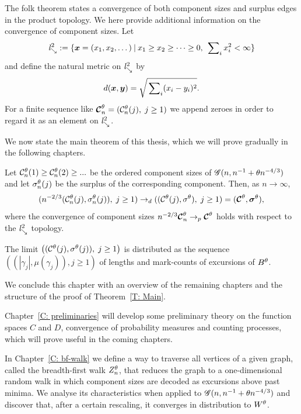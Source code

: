 The folk theorem states a convergence of both component sizes and surplus edges in the product topology.
We here provide additional information on the convergence of component sizes.
Let
\begin{equation}
	\mathit{l}^2_{\searrow} := \{ \boldsymbol{x} = (x_1, x_2, \dots) \: | \: x_1 \geq x_2 \geq \dots \geq 0, \; \sideset{}{_i}\sum x^2_i < \infty \}
\end{equation}
and define the natural metric on $\mathit{l}^2_{\searrow}$ by
\begin{equation}
	d(\boldsymbol{x},\boldsymbol{y}) = \sqrt{\sideset{}{_i}\sum (x_i - y_i)^2}.
\end{equation}
For a finite sequence like $\boldsymbol{\mathcal{C}}^{\theta}_n = (\mathcal{C}^{\theta}_n(j), \; j \geq 1)$ we append zeroes in order to regard it as an element on $\mathit{l}^2_{\searrow}$.


We now state the main theorem of this thesis, which we will prove gradually in the following chapters.
\begin{theorem} \label{T: Main}
	Let $\mathcal{C}^{\theta}_n(1) \geq \mathcal{C}^{\theta}_n(2) \geq ... $ be the ordered component sizes of $\mathscr{G}(n, n^{-1} + \theta n^{-4/3})$
	and let $\mathcal{\sigma}^{\theta}_n(j)$ be the surplus of the corresponding component.
	Then, as $n \rightarrow \infty$,
	\begin{equation}
	( n^{-2 / 3} ( \mathcal{C}^{\theta}_n(j), \mathcal{\sigma}^{\theta}_n(j) ), \; j \geq 1 ) 
	\rightarrow_d
	( (\mathcal{C}^{\theta}(j), \mathcal{\sigma}^{\theta}), \; j \geq 1 )
	= ( \boldsymbol{\mathcal{C}}^{\theta}, \boldsymbol{\mathcal{\sigma}}^{\theta} ),
	\end{equation}
	where the convergence of component sizes
	$n^{-2 / 3} \boldsymbol{\mathcal{C}}^{\theta}_n \rightarrow_p \boldsymbol{\mathcal{C}}^{\theta}$
	holds with respect to the $\mathit{l}^2_{\searrow}$ topology.
	
	The limit
	$\left( ( \mathcal{C}^{\theta}(j), \mathcal{\sigma}^{\theta}(j) ), \; j \geq 1 \right)$
	is distributed as the sequence
	$ \left( (|\gamma_j|, \mu(\gamma_j)), j \geq 1  \right) $
	of lengths and mark-counts of excursions of $B^{\theta}$.
\end{theorem}

We conclude this chapter with an overview of the remaining chapters and the structure of the proof of Theorem~\ref{T: Main}.

Chapter~\ref{C: preliminaries} will develop some preliminary theory on the function spaces $C$ and $D$,
convergence of probability measures and counting processes, which will prove useful in the coming chapters.

In Chapter~\ref{C: bf-walk} we define a way to traverse all vertices of a given graph, called the breadth-first walk $Z_n^{\theta}$, 
that reduces the graph to a one-dimensional random walk in which component sizes are decoded as excursions above past minima.
We analyse its characteristics when applied to $\mathscr{G}(n, n^{-1} + \theta n^{-4/3})$ and discover that, after a certain rescaling, it converges in distribution to $W^{\theta}$.

